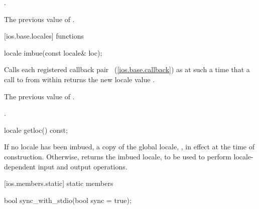 \begin{itemdescr}
\pnum
\postcondition
{}.

\pnum
\returns
The previous value of
.
\end{itemdescr}

[ios.base.locales]{ functions}

%
\begin{itemdecl}
locale imbue(const locale& loc);
\end{itemdecl}

\begin{itemdescr}
\pnum
\effects
Calls each registered callback pair
~(\ref{ios.base.callback})
as
at such a time that a call to
from within
returns the new locale value
.

\pnum
\returns
The previous value of
.

\pnum
\postcondition
{}.
\end{itemdescr}

%
\begin{itemdecl}
locale getloc() const;
\end{itemdecl}

\begin{itemdescr}
\pnum
\returns
If no locale has been imbued, a copy of the global \Cpp locale,
,
in effect at the time of construction.
Otherwise, returns the imbued locale, to be used to
perform locale-dependent input and output operations.
\end{itemdescr}

[ios.members.static]{ static members}

%
\begin{itemdecl}
bool sync_with_stdio(bool sync = true);
\end{itemdecl}

